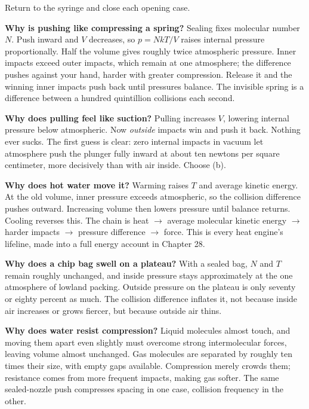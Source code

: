 
Return to the syringe and close each opening case.

\textbf{Why is pushing like compressing a spring?} Sealing fixes molecular number \(N\). Push inward and \(V\) decreases, so \(p=NkT/V\) raises internal pressure proportionally. Half the volume gives roughly twice atmospheric pressure. Inner impacts exceed outer impacts, which remain at one atmosphere; the difference pushes against your hand, harder with greater compression. Release it and the winning inner impacts push back until pressures balance. The invisible spring is a difference between a hundred quintillion collisions each second.

\textbf{Why does pulling feel like suction?} Pulling increases \(V\), lowering internal pressure below atmospheric. Now \emph{outside} impacts win and push it back. Nothing ever sucks. The first guess is clear: zero internal impacts in vacuum let atmosphere push the plunger fully inward at about ten newtons per square centimeter, more decisively than with air inside. Choose (b).

\textbf{Why does hot water move it?} Warming raises \(T\) and average kinetic energy. At the old volume, inner pressure exceeds atmospheric, so the collision difference pushes outward. Increasing volume then lowers pressure until balance returns. Cooling reverses this. The chain is heat \(\rightarrow\) average molecular kinetic energy \(\rightarrow\) harder impacts \(\rightarrow\) pressure difference \(\rightarrow\) force. This is every heat engine's lifeline, made into a full energy account in Chapter 28.

\textbf{Why does a chip bag swell on a plateau?} With a sealed bag, \(N\) and \(T\) remain roughly unchanged, and inside pressure stays approximately at the one atmosphere of lowland packing. Outside pressure on the plateau is only seventy or eighty percent as much. The collision difference inflates it, not because inside air increases or grows fiercer, but because outside air thins.

\textbf{Why does water resist compression?} Liquid molecules almost touch, and moving them apart even slightly must overcome strong intermolecular forces, leaving volume almost unchanged. Gas molecules are separated by roughly ten times their size, with empty gaps available. Compression merely crowds them; resistance comes from more frequent impacts, making gas softer. The same sealed-nozzle push compresses spacing in one case, collision frequency in the other.

